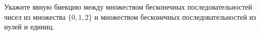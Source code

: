 Укажите явную биекцию между множеством бесконечных последовательностей чисел из множества $\{0, 1, 2\}$ и
множеством бесконечных последовательностей из нулей и единиц.
